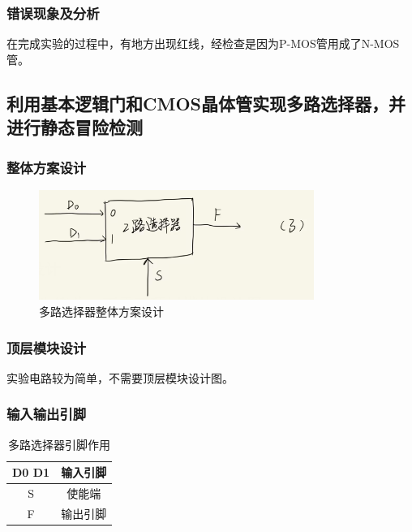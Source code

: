 \documentclass{article}
\begin{document}
    \subsubsection{错误现象及分析}
    在完成实验的过程中，有地方出现红线，经检查是因为P-MOS管用成了N-MOS管。

    \subsection{利用基本逻辑门和CMOS晶体管实现多路选择器，并进行静态冒险检测}

    \subsubsection{整体方案设计}
    \begin{figure}[H]
    \centering
    \includegraphics[width=0.8\textwidth]{3.1.png}
    \caption{多路选择器整体方案设计}
    \end{figure}
    
    \subsubsection{顶层模块设计}
    实验电路较为简单，不需要顶层模块设计图。

    \subsubsection{输入输出引脚}
    \begin{table}[H]
    \centering
    \begin{tabular}{|c|c|}
        \hline
        D0 D1 & 输入引脚 \\ \hline
        S & 使能端 \\ \hline 
        F   & 输出引脚 \\ \hline
    \end{tabular}
    \caption{多路选择器引脚作用}
    \end{table}
\end{document}
